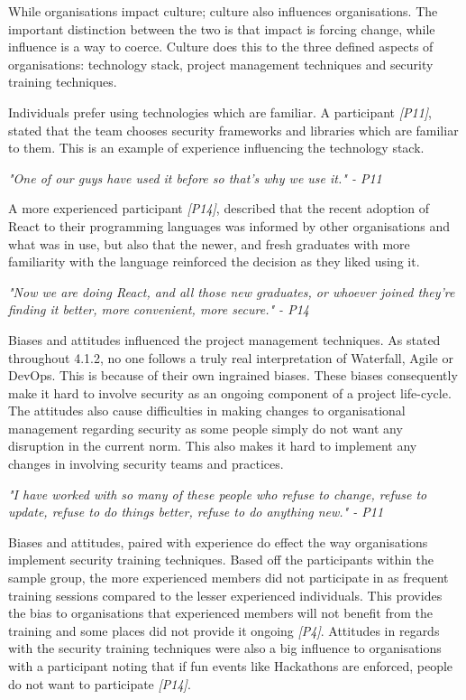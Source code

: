 While organisations impact culture; culture also influences organisations. The important distinction between the two is that impact is forcing change, while influence is a way to coerce.   Culture does this to the three defined aspects of organisations: technology stack, project management techniques and security training techniques. 
\newline
\par
Individuals prefer using technologies which are familiar. A participant \textit{[P11]},  stated that the team chooses security frameworks and libraries which are familiar to them. This is an example of experience influencing the technology stack. 
\newline
\par
\textit{"One of our guys have used it before so that's why we use it." - P11}
\newline
\par
A more experienced participant \textit{[P14]}, described that the recent adoption of React to their programming languages was informed by other organisations and what was in use, but also that the newer, and fresh graduates with more familiarity with the language reinforced the decision as they liked using it. 
\newline
\par
\textit{"Now we are doing React, and all those new graduates, or whoever joined they're finding it better, more convenient, more secure." - P14}
\newline
\par
Biases and attitudes influenced the project management techniques. As stated throughout 4.1.2, no one follows a truly real interpretation of Waterfall, Agile or DevOps. This is because of their own ingrained biases. These biases consequently make it hard to involve security as an ongoing component of a project life-cycle. The attitudes also cause difficulties in making changes to organisational management regarding security as some people simply do not want any disruption in the current norm. This also makes it hard to implement any changes in involving security teams and practices.
\newline
\par
\textit{"I have worked with so many of these people who refuse to change, refuse to update, refuse to do things better, refuse to do anything new." - P11}
\newline
\par
Biases and attitudes, paired with experience do effect the way organisations implement security training techniques. Based off the participants within the sample group, the more experienced members did not participate in as frequent training sessions compared to the lesser experienced individuals. This provides the bias to organisations that experienced members will not benefit from the training and some places did not provide it ongoing \textit{[P4]}. Attitudes in regards with the security training techniques were also a big influence to organisations with a participant noting that if fun events like Hackathons are enforced, people do not want to participate\textit{ [P14]}.
